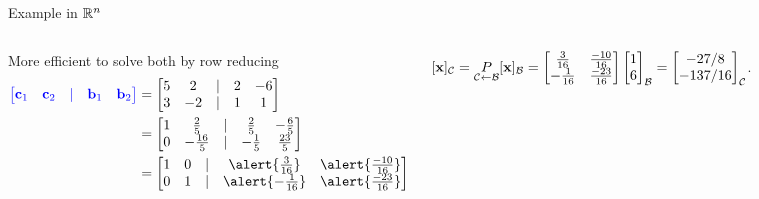 \documentclass[xcolor=dvipsnames,aspectratio=169,t]{beamer}
\renewcommand{\C}{\mathcal{C}}
\begin{document}
\begin{frame}{Example in $\mathbb{R}^n$}
\begin{columns}
  \pause
  More efficient to solve \alert{both} by row reducing
  \begin{align*}
  \colorb{\begin{bmatrix} \c_1 &  \c_2 & | &  \b_1 &  \b_2 \end{bmatrix}} &=  
  \begin{bmatrix} 5 & 2 & | & 2 & -6 \\
  3 & -2 & | & 1 & 1 \end{bmatrix} \\
  &= \begin{bmatrix} 1 & \frac{2}{5} & | & \frac{2}{5} & -\frac{6}{5} \\
  0 & -\frac{16}{5} & | & -\frac{1}{5} & \frac{23}{5} \end{bmatrix} \\
  &= \begin{bmatrix} 1 & 0 & | & \alert{\frac{3}{16}} & \alert{\frac{-10}{16}} \\
  0 & 1 & | & \alert{-\frac{1}{16}} &\alert{ \frac{-23}{16}} \end{bmatrix} 
  \end{align*}
  
  \pause
  $[\x]_\C = \underset{\C\leftarrow\B}{P} [\x]_\B
  =\begin{bmatrix}\frac{3}{16} & \frac{-10}{16} \\ -\frac{1}{16} & \frac{-23}{16} \end{bmatrix}
  \begin{bmatrix} 1 \\ 6 \end{bmatrix}_\B
  =\begin{bmatrix} -27/8 \\ -137/16 \end{bmatrix}_\C$.
  \end{columns}
\end{frame}
\end{document}
